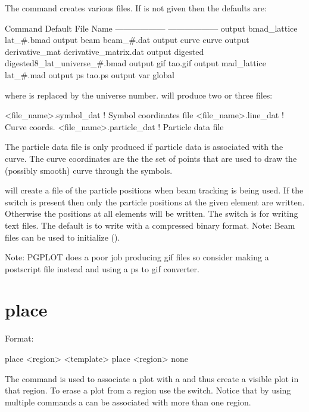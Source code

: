 \vskip 0.2in 
The  command creates various files. If
 is not given then the defaults are:
\begin{example}
  Command                         Default File Name
  ------------------              ------------------
  output bmad_lattice             lat_#.bmad
  output beam                     beam_#.dat
  output curve                    curve
  output derivative_mat           derivative_matrix.dat              
  output digested                 digested8_lat_universe_#.bmad
  output gif                      tao.gif
  output mad_lattice              lat_#.mad
  output ps                       tao.ps
  output var                      global%
\end{example}
where \vn{\#} is replaced by the universe number.  will produce two or three files: 
\begin{example}
  <file_name>.symbol_dat    ! Symbol coordinates file
  <file_name>.line_dat      ! Curve coords.
  <file_name>.particle_dat  ! Particle data file
\end{example}
The particle data file is only produced if particle
data is associated with the curve.
The curve coordinates are the the set of points that are used to draw the
(possibly smooth) curve through the symbols.

 will create a file of the particle positions when
beam tracking is being used. If the switch  is present then
only the particle positions at the given element are written. 
Otherwise the positions at all elements will be written. The
 switch is for writing text files. The default is to write
with a compressed binary format.  Note: Beam files can be used to
initialize \tao (). 

Note: PGPLOT does a poor job producing gif files so consider
making a postscript file instead and using a ps to gif converter.

\section{place}
\label{s:place}

Format:
\begin{example}
  place <region> <template>
  place <region> none
\end{example}

\vskip 0.2in 
The  command is used to associate a  plot
with a  and thus create a visible plot in that region. To
erase a plot from a region use the  switch. Notice that by
using multiple  commands a  can be associated
with more than one region.

